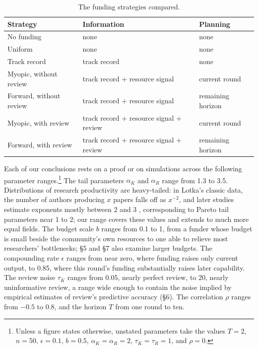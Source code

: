 \documentclass[article, 11pt, reqno]{amsart}
\theoremstyle{named}
\begin{document}
\begin{table}[t]
\centering
\footnotesize
\setlength{\tabcolsep}{4pt}
\begin{tabular*}{\textwidth}{@{\extracolsep{\fill}}lll@{}}
\toprule
Strategy & Information & Planning \\
\midrule
No funding & none & none \\
Uniform & none & none \\
Track record & track record & none \\
Myopic, without review & track record + resource signal & current round \\
Forward, without review & track record + resource signal & remaining horizon \\
Myopic, with review & track record + resource signal + review & current round \\
Forward, with review & track record + resource signal + review & remaining horizon \\
\bottomrule
\end{tabular*}
\caption{The funding strategies compared.}
\label{tab:strategies}
\end{table}

Each of our conclusions rests on a proof or on simulations across the following parameter ranges.\footnote{Unless a figure states otherwise, unstated parameters take the values $T = 2$, $n = 50$, $\epsilon = 0.1$, $b = 0.5$, $\alpha_K = \alpha_R = 2$, $\tau_K = \tau_R = 1$, and $\rho = 0$.
} The tail parameters $\alpha_K$ and $\alpha_R$ range from 1.3 to 3.5. Distributions of research productivity are heavy-tailed: in Lotka's classic data, the number of authors producing $x$ papers falls off as $x^{-2}$, and later studies estimate exponents mostly between 2 and 3 \citep{Lotka1926, Nicholls1989}, %
corresponding to Pareto tail parameters near 1 to 2; our range covers these values and extends to much more equal fields. The budget scale $b$ ranges from 0.1 to 1, from a funder whose budget is small beside the community's own resources to one able to relieve most researchers' bottlenecks; \S5 and \S7 also examine larger budgets. The compounding rate $\epsilon$ ranges from near zero, where funding raises only current output, to 0.85, where this round's funding substantially raises later capability. The review noise $\tau_K$ ranges from 0.05, nearly perfect review, to 20, nearly uninformative review, a range wide enough to contain the noise implied by empirical estimates of review's predictive accuracy (\S6). The correlation $\rho$ ranges from $-0.5$ to 0.8, and the horizon $T$ from one round to ten.
\end{document}
